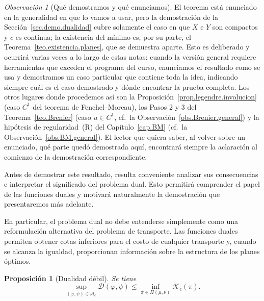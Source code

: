 \documentclass[12pt, a4paper]{amsbook}
\newcommand{\D}{{\mathcal D}}
\newtheorem{prop}[teo]{Proposición}
\theoremstyle{remark}
\newtheorem{obs}[teo]{Observación}
\theoremstyle{definition}
\numberwithin{section}{chapter}
\numberwithin{subsection}{section}
\numberwithin{equation}{section}
\numberwithin{figure}{chapter}
\begin{document}
\begin{obs}[Qué demostramos y qué enunciamos]\label{obs.alcance.pruebas}
El teorema está enunciado en la generalidad en que lo vamos a usar, pero la
demostración de la Sección~\ref{sec.demo.dualidad} cubre solamente el caso en
que $X$ e $Y$ son compactos y $c$ es continua; la existencia del mínimo es,
por su parte, el Teorema~\ref{teo.existencia.planes}, que se demuestra aparte.
Esto es deliberado y ocurrirá varias veces a lo largo de estas notas: cuando
la versión general requiere herramientas que exceden el programa del curso,
enunciamos el resultado como se usa y demostramos un caso particular que
contiene toda la idea, indicando siempre cuál es el caso demostrado y dónde
encontrar la prueba completa. Los otros lugares donde procedemos así son la
Proposición~\ref{prop.legendre.involucion} (caso $C^1$ del teorema de
Fenchel--Moreau), los Pasos 2 y 3 del Teorema~\ref{teo.Brenier} (caso
$u\in C^1$, cf.\ la Observación~\ref{obs.Brenier.general}) y la hipótesis de
regularidad~(R) del Capítulo~\ref{cap.BM} (cf.\ la
Observación~\ref{obs.BM.general}). El lector que quiera saber, al volver sobre
un enunciado, qué parte quedó demostrada aquí, encontrará siempre la
aclaración al comienzo de la demostración correspondiente.
\end{obs}

Antes de demostrar este resultado, resulta conveniente analizar sus consecuencias e interpretar el significado del problema dual. Esto permitirá comprender el papel de las funciones duales y motivará naturalmente la demostración que presentaremos más adelante.

En particular, el problema dual no debe entenderse simplemente como una reformulación alternativa del problema de transporte. Las funciones duales permiten obtener cotas inferiores para el costo de cualquier transporte y, cuando se alcanza la igualdad, proporcionan información sobre la estructura de los planes óptimos.

\begin{prop}[Dualidad débil]\label{prop.dualidad.debil}
Se tiene
\[
\sup_{(\varphi,\psi)\in\mathcal A_c}
\D(\varphi,\psi)
\le
\inf_{\pi\in\Pi(\mu,\nu)}
\mathcal K_c(\pi).
\]
\end{prop}
\end{document}
